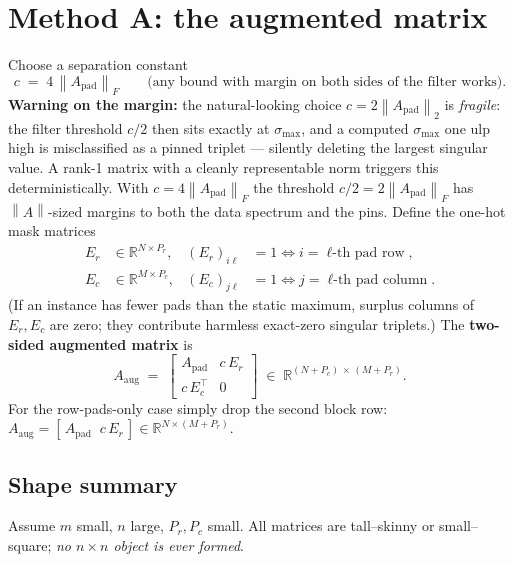 \documentclass[11pt]{article}
\newcommand{\R}{\mathbb{R}}
\newcommand{\Apad}{A_{\mathrm{pad}}}
\newcommand{\Aaug}{A_{\mathrm{aug}}}
\newcommand{\norm}[1]{\left\lVert #1 \right\rVert}
\begin{document}
\section{Method A: the augmented matrix}\label{sec:aug}

Choose a separation constant
\[
  c \;=\; 4\,\norm{\Apad}_F
  \qquad \text{(any bound with margin on both sides of the filter works).}
\]
\textbf{Warning on the margin:} the natural-looking choice $c = 2\norm{\Apad}_2$
is \emph{fragile}: the filter threshold $c/2$ then sits exactly at
$\sigma_{\max}$, and a computed $\sigma_{\max}$ one ulp high is misclassified
as a pinned triplet --- silently deleting the largest singular value. A rank-1
matrix with a cleanly representable norm triggers this deterministically. With
$c = 4\norm{\Apad}_F$ the threshold $c/2 = 2\norm{\Apad}_F$ has
$\norm{A}$-sized margins to both the data spectrum and the pins.
Define the one-hot mask matrices
\begin{align*}
  E_r &\in \R^{N \times P_r}, & (E_r)_{i\ell} &= 1 \iff i = \text{$\ell$-th pad row},\\
  E_c &\in \R^{M \times P_c}, & (E_c)_{j\ell} &= 1 \iff j = \text{$\ell$-th pad column}.
\end{align*}
(If an instance has fewer pads than the static maximum, surplus columns of
$E_r, E_c$ are zero; they contribute harmless exact-zero singular triplets.)
The \textbf{two-sided augmented matrix} is
\[
  \Aaug \;=\;
  \begin{bmatrix}
    \Apad & c\,E_r \\[2pt]
    c\,E_c^{\!\top} & 0
  \end{bmatrix}
  \;\in\; \R^{(N + P_c)\,\times\,(M + P_r)} .
\]
For the row-pads-only case simply drop the second block row:
$\Aaug = [\,\Apad \;\; c\,E_r\,] \in \R^{N \times (M + P_r)}$.

\subsection*{Shape summary}

Assume $m$ small, $n$ large, $P_r, P_c$ small. All matrices are tall--skinny or
small--square; \emph{no $n \times n$ object is ever formed}.
\end{document}

